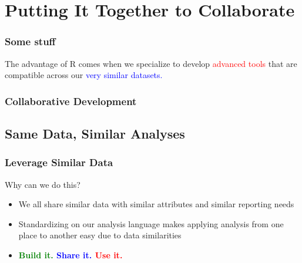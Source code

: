 \documentclass{beamer}
\begin{document}
\section{Putting It Together to Collaborate}

\begin{frame}
\frametitle{Some stuff}
The advantage of R comes when we specialize to develop \textcolor{red}{advanced tools} that are compatible across our \textcolor{blue}{very similar datasets.} 
\end{frame}


{
\begin{frame}[plain]
\frametitle{Collaborative Development}
\end{frame}
}


\subsection{Same Data, Similar Analyses}

\begin{frame}
\frametitle{Leverage Similar Data}
\Large Why can we do this?
\begin{itemize}
  \item We all share similar data with similar attributes and similar reporting needs
  \item Standardizing on our analysis language makes applying analysis from one place to another easy due to data similarities
  \item \Large \textbf{\textcolor{green}{Build it.} \textcolor{blue}{Share it.} \textcolor{red}{Use it.}}
\end{itemize}
\end{frame}
\end{document}
